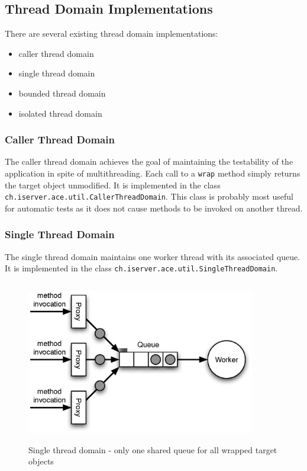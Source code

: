 \subsection{Thread Domain Implementations}
There are several existing thread domain implementations:
\begin{itemize}
 \item caller thread domain
 \item single thread domain
 \item bounded thread domain
 \item isolated thread domain
\end{itemize}

\subsubsection{Caller Thread Domain}
The caller thread domain achieves the goal of maintaining the testability
of the application in spite of multithreading. Each call to a
\texttt{wrap} method simply returns the target object unmodified. It
is implemented in the class \texttt{ch.iserver.ace.util.CallerThreadDomain}.
This class is probably most useful for automatic tests as it does not cause
methods to be invoked on another thread.

\subsubsection{Single Thread Domain}
The single thread domain maintains one worker thread with its associated
queue. It is implemented in the class
\texttt{ch.iserver.ace.util.SingleThreadDomain}.

\begin{figure}[H]
 \centering
 \includegraphics[width=10cm,height=7.1cm]{../images/finalreport/threaddomain_single.eps}
 \caption{Single thread domain - only one shared queue for all wrapped target objects}
\end{figure}

